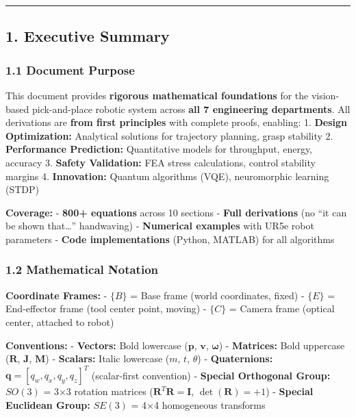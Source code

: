 \documentclass[
]{article}
\begin{document}
\begin{center}\rule{0.5\linewidth}{0.5pt}\end{center}

\hypertarget{executive-summary}{%
\subsection{1. Executive Summary}\label{executive-summary}}

\hypertarget{document-purpose}{%
\subsubsection{1.1 Document Purpose}\label{document-purpose}}

This document provides \textbf{rigorous mathematical foundations} for
the vision-based pick-and-place robotic system across \textbf{all 7
engineering departments}. All derivations are \textbf{from first
principles} with complete proofs, enabling: 1. \textbf{Design
Optimization:} Analytical solutions for trajectory planning, grasp
stability 2. \textbf{Performance Prediction:} Quantitative models for
throughput, energy, accuracy 3. \textbf{Safety Validation:} FEA stress
calculations, control stability margins 4. \textbf{Innovation:} Quantum
algorithms (VQE), neuromorphic learning (STDP)

\textbf{Coverage:} - \textbf{800+ equations} across 10 sections -
\textbf{Full derivations} (no ``it can be shown that\ldots{}''
handwaving) - \textbf{Numerical examples} with UR5e robot parameters -
\textbf{Code implementations} (Python, MATLAB) for all algorithms

\hypertarget{mathematical-notation}{%
\subsubsection{1.2 Mathematical Notation}\label{mathematical-notation}}

\textbf{Coordinate Frames:} - \(\{B\}\) = Base frame (world coordinates,
fixed) - \(\{E\}\) = End-effector frame (tool center point, moving) -
\(\{C\}\) = Camera frame (optical center, attached to robot)

\textbf{Conventions:} - \textbf{Vectors:} Bold lowercase
(\(\mathbf{p}\), \(\mathbf{v}\), \(\mathbf{\omega}\)) -
\textbf{Matrices:} Bold uppercase (\(\mathbf{R}\), \(\mathbf{J}\),
\(\mathbf{M}\)) - \textbf{Scalars:} Italic lowercase (\(m\), \(t\),
\(\theta\)) - \textbf{Quaternions:}
\(\mathbf{q} = [q_w, q_x, q_y, q_z]^T\) (scalar-first convention) -
\textbf{Special Orthogonal Group:} \(SO(3)\) = 3×3 rotation matrices
(\(\mathbf{R}^T \mathbf{R} = \mathbf{I}\), \(\det(\mathbf{R}) = +1\)) -
\textbf{Special Euclidean Group:} \(SE(3)\) = 4×4 homogeneous transforms
\end{document}
